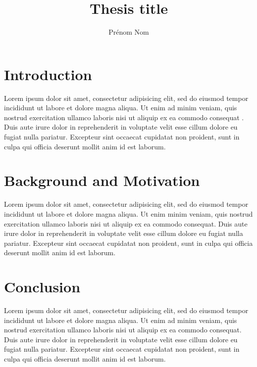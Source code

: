 \documentclass[anglais]{thesis-ubl}
\title{Thesis title}
\author{Prénom Nom}
\begin{document}


\tableofcontents

\mainmatter



\chapter{Introduction}

Lorem ipsum dolor sit amet, consectetur adipisicing elit, sed do eiusmod tempor incididunt ut labore et dolore magna aliqua. Ut enim ad minim veniam, quis nostrud exercitation ullamco laboris nisi ut aliquip ex ea commodo consequat \cite{wilcoxon1992individual}. Duis aute irure dolor in reprehenderit in voluptate velit esse cillum dolore eu fugiat nulla pariatur. Excepteur sint occaecat cupidatat non proident, sunt in culpa qui officia deserunt mollit anim id est laborum.

\chapter{Background and Motivation}

Lorem ipsum dolor sit amet, consectetur adipisicing elit, sed do eiusmod tempor incididunt ut labore et dolore magna aliqua. Ut enim \cite{ozsu2011principles} minim veniam, quis nostrud exercitation ullamco laboris nisi ut aliquip ex ea commodo consequat. Duis aute irure dolor in reprehenderit in voluptate velit esse cillum dolore eu fugiat nulla pariatur. Excepteur sint occaecat cupidatat non proident, sunt in culpa qui officia deserunt mollit anim id est laborum.

\chapter{Conclusion}

Lorem ipsum dolor sit amet, consectetur adipisicing elit, sed do eiusmod tempor incididunt ut labore et dolore magna aliqua. Ut enim ad minim veniam, quis nostrud exercitation ullamco laboris nisi ut aliquip ex ea commodo consequat. Duis aute irure dolor in reprehenderit in voluptate velit esse cillum dolore eu fugiat nulla pariatur. Excepteur sint occaecat cupidatat non proident, sunt in culpa qui officia deserunt mollit anim id est laborum.
\end{document}
